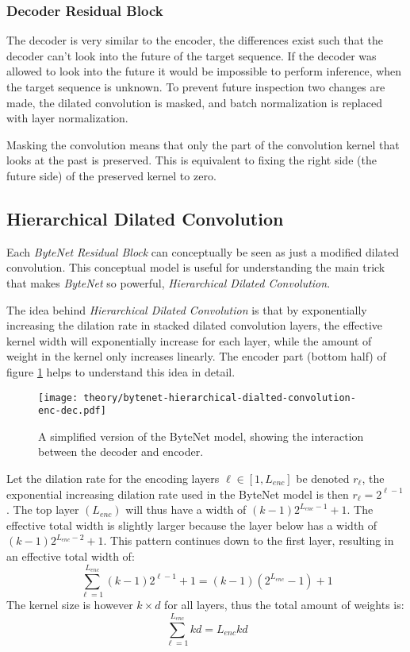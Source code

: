 \subsubsection{Decoder Residual Block}

The decoder is very similar to the encoder, the differences exist such that the decoder can't look into the future of the target sequence. If the decoder was allowed to look into the future it would be impossible to perform inference, when the target sequence is unknown. To prevent future inspection two changes are made‚ the dilated convolution is masked, and batch normalization is replaced with layer normalization.

Masking the convolution means that only the part of the convolution kernel that looks at the past is preserved. This is equivalent to fixing the right side (the future side) of the preserved kernel to zero.

\subsection{Hierarchical Dilated Convolution}
\label{sec:theory:bytenet:hierarchical-dilated-convolution}

Each \textit{ByteNet Residual Block} can conceptually be seen as just a modified dilated convolution. This conceptual model is useful for understanding the main trick that makes \textit{ByteNet} so powerful, \textit{Hierarchical Dilated Convolution}.

The idea behind \textit{Hierarchical Dilated Convolution} is that by exponentially increasing the dilation rate in stacked dilated convolution layers, the effective kernel width will exponentially increase for each layer, while the amount of weight in the kernel only increases linearly. The encoder part (bottom half) of figure \ref{fig:bytenet:simplified-hdc} helps to understand this idea in detail.

\begin{figure}[h]
    \centering
    \texttt{[image: theory/bytenet-hierarchical-dialted-convolution-enc-dec.pdf]}
    \caption{A simplified version of the ByteNet model, showing the interaction between the decoder and encoder.}
    \label{fig:bytenet:simplified-hdc}
\end{figure}

Let the dilation rate for the encoding layers $\ell \in [1, L_{enc}]$ be denoted $r_\ell$, the exponential increasing dilation rate used in the ByteNet model is then $r_\ell = 2^{\ell - 1}$. The top layer $(L_{enc})$ will thus have a width of $(k-1) 2^{L_{enc} -1} + 1$. The effective total width is slightly larger because the layer below has a width of $(k-1) 2^{L_{enc} - 2} + 1$. This pattern continues down to the first layer, resulting in an effective total width of:
\begin{equation}
\sum_{\ell = 1}^{L_{enc}} (k - 1) 2^{\ell-1} + 1 = (k - 1) (2^{L_{enc}} - 1) + 1
\end{equation}
The kernel size is however $k \times d$ for all layers, thus the total amount of weights is:
\begin{equation}
\sum_{\ell = 1}^{L_{enc}} k d = L_{enc} k d
\end{equation}


